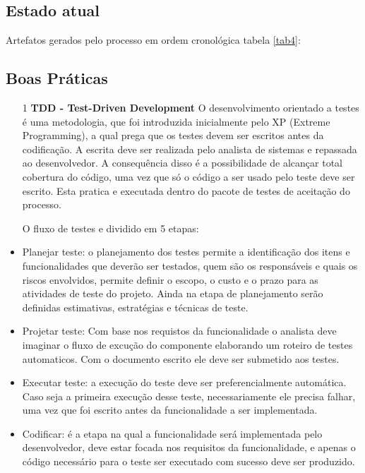 \documentclass[	DIV=calc,%
							paper=a4,%
							fontsize=12pt,%
							onecolumn]{scrartcl}	 					%
\begin{document}
    
\subsection {Estado atual}

Artefatos gerados pelo processo em ordem cronológica tabela \ref{tab4}:


\subsection{Boas Práticas}
\begin{itemize}

\item[1]  {\textbf{TDD - Test-Driven Development}}
O desenvolvimento orientado a testes é uma metodologia, que foi introduzida inicialmente pelo XP (Extreme Programming), a qual prega que os testes devem ser escritos antes da codificação. A escrita deve ser realizada pelo analista de sistemas e repassada ao desenvolvedor. A consequência disso é a possibilidade de alcançar total cobertura do código, uma vez que só o código a ser usado pelo teste deve ser escrito. Esta pratica e executada dentro do pacote de testes de aceitação do processo.

O fluxo de testes e dividido em 5 etapas:

    \item Planejar teste: o planejamento dos testes permite a identificação dos itens e funcionalidades que deverão ser testados, quem são os responsáveis e quais os riscos envolvidos, permite  definir o escopo, o custo e o prazo para as atividades de teste do projeto. Ainda na etapa de planejamento serão definidas estimativas, estratégias e técnicas de teste.
    
    \item Projetar teste: Com base nos requistos da funcionalidade o analista deve imaginar o fluxo de excução do componente elaborando um roteiro de testes automaticos. Com o documento escrito ele deve ser submetido aos testes.
    
    \item Executar teste: a execução do teste deve ser preferencialmente automática. Caso seja a primeira execução desse teste, necessariamente ele precisa falhar, uma vez que foi escrito antes da funcionalidade a ser implementada.

    \item Codificar: é a etapa na qual a funcionalidade será implementada pelo desenvolvedor, deve estar focada nos requisitos da funcionalidade, e apenas o código necessário para o teste ser executado com sucesso deve ser produzido.
    

\end{itemize}
\end{document}
